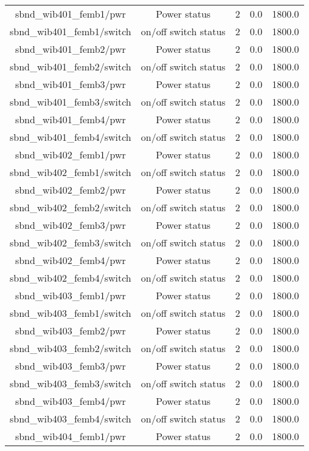 \begin{table}[ptb]
\begin{tabular}{c | c c c c}
sbnd_wib401_femb1/pwr & Power status & 2 & 0.0 & 1800.0\\ 
sbnd_wib401_femb1/switch & on/off switch status & 2 & 0.0 & 1800.0\\ 
sbnd_wib401_femb2/pwr & Power status & 2 & 0.0 & 1800.0\\ 
sbnd_wib401_femb2/switch & on/off switch status & 2 & 0.0 & 1800.0\\ 
sbnd_wib401_femb3/pwr & Power status & 2 & 0.0 & 1800.0\\ 
sbnd_wib401_femb3/switch & on/off switch status & 2 & 0.0 & 1800.0\\ 
sbnd_wib401_femb4/pwr & Power status & 2 & 0.0 & 1800.0\\ 
sbnd_wib401_femb4/switch & on/off switch status & 2 & 0.0 & 1800.0\\ 
sbnd_wib402_femb1/pwr & Power status & 2 & 0.0 & 1800.0\\ 
sbnd_wib402_femb1/switch & on/off switch status & 2 & 0.0 & 1800.0\\ 
sbnd_wib402_femb2/pwr & Power status & 2 & 0.0 & 1800.0\\ 
sbnd_wib402_femb2/switch & on/off switch status & 2 & 0.0 & 1800.0\\ 
sbnd_wib402_femb3/pwr & Power status & 2 & 0.0 & 1800.0\\ 
sbnd_wib402_femb3/switch & on/off switch status & 2 & 0.0 & 1800.0\\ 
sbnd_wib402_femb4/pwr & Power status & 2 & 0.0 & 1800.0\\ 
sbnd_wib402_femb4/switch & on/off switch status & 2 & 0.0 & 1800.0\\ 
sbnd_wib403_femb1/pwr & Power status & 2 & 0.0 & 1800.0\\ 
sbnd_wib403_femb1/switch & on/off switch status & 2 & 0.0 & 1800.0\\ 
sbnd_wib403_femb2/pwr & Power status & 2 & 0.0 & 1800.0\\ 
sbnd_wib403_femb2/switch & on/off switch status & 2 & 0.0 & 1800.0\\ 
sbnd_wib403_femb3/pwr & Power status & 2 & 0.0 & 1800.0\\ 
sbnd_wib403_femb3/switch & on/off switch status & 2 & 0.0 & 1800.0\\ 
sbnd_wib403_femb4/pwr & Power status & 2 & 0.0 & 1800.0\\ 
sbnd_wib403_femb4/switch & on/off switch status & 2 & 0.0 & 1800.0\\ 
sbnd_wib404_femb1/pwr & Power status & 2 & 0.0 & 1800.0\\ 

\end{tabular}
\end{table}
